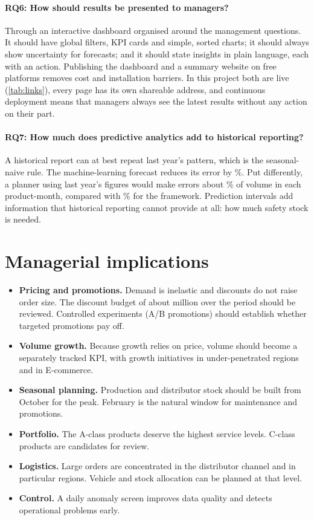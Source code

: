 \paragraph{RQ6: How should results be presented to managers?}
Through an interactive dashboard organised around the management questions. It should have global filters,
KPI cards and simple, sorted charts; it should always show uncertainty for forecasts; and it should state
insights in plain language, each with an action. Publishing the dashboard and a summary website on free
platforms removes cost and installation barriers. In this project both are live (\cref{tab:links}), every page
has its own shareable address, and continuous deployment means that managers always see the latest results
without any action on their part.

\paragraph{RQ7: How much does predictive analytics add to historical reporting?}
A historical report can at best repeat last year's pattern, which is the seasonal-naive rule. The
machine-learning forecast reduces its error by \GainVsSNaive\%. Put differently, a planner using last year's
figures would make errors about \SNaiveWAPE\% of volume in each product-month, compared with \BestRegWAPE\% for
the framework. Prediction intervals add information that historical reporting cannot provide at all: how much
safety stock is needed.

\section{Managerial implications}
\begin{itemize}
  \item \textbf{Pricing and promotions.} Demand is inelastic and discounts do not raise order size. The discount
        budget of about \BDT\DiscountCost million over the period should be reviewed. Controlled experiments
        (A/B promotions) should establish whether targeted promotions pay off.
  \item \textbf{Volume growth.} Because growth relies on price, volume should become a separately tracked KPI,
        with growth initiatives in under-penetrated regions and in E-commerce.
  \item \textbf{Seasonal planning.} Production and distributor stock should be built from October for the
        \PeakMonth peak. February is the natural window for maintenance and promotions.
  \item \textbf{Portfolio.} The A-class products deserve the highest service levels. C-class products are
        candidates for review.
  \item \textbf{Logistics.} Large orders are concentrated in the distributor channel and in particular regions.
        Vehicle and stock allocation can be planned at that level.
  \item \textbf{Control.} A daily anomaly screen improves data quality and detects operational problems early.
\end{itemize}

